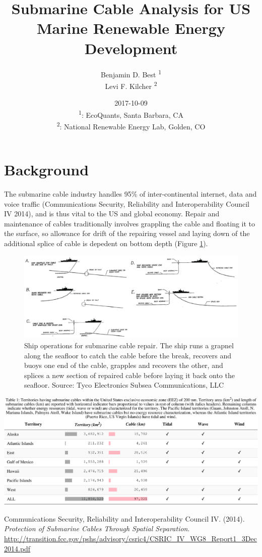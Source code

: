 \documentclass[]{article}
\title{Submarine Cable Analysis for US Marine Renewable Energy Development}
\author{Benjamin D. Best \textsuperscript{1} \\ Levi F. Kilcher \textsuperscript{2}}
\date{2017-10-09\\
\textsuperscript{1}: EcoQuants, Santa Barbara, CA\\
\textsuperscript{2}: National Renewable Energy Lab, Golden, CO \newline}
\begin{document}
\maketitle

{
\setcounter{tocdepth}{4}
\tableofcontents
}
\listoffigures
\section{Background}\label{background}

The submarine cable industry handles 95\% of inter-continental internet,
data and voice traffic (Communications Security, Reliability and
Interoperability Council IV 2014), and is thus vital to the US and
global economy. Repair and maintenance of cables traditionally involves
grappling the cable and floating it to the surface, so allowance for
drift of the repairing vessel and laying down of the additional splice
of cable is depedent on bottom depth (Figure
\ref{fig:figSubmarineCableRepair}).

\begin{figure}
\includegraphics[width=14.17in]{figs/cable-repair-process} \caption{Ship operations for submarine cable repair. The ship runs a grapnel along the seafloor to catch the cable before the break, recovers and buoys one end of the cable, grapples and recovers the other, and splices a new section of repaired cable before laying it back onto the seafloor. Source: Tyco Electronics Subsea Communications, LLC}\label{fig:figSubmarineCableRepair}
\end{figure}

\includegraphics{report_tmp2_files/figure-latex/tbl01Territories-1.pdf}

\hypertarget{refs}{}
\hypertarget{ref-communicationssecurityreliabilityandinteroperabilitycounciliv_protection_2014}{}
Communications Security, Reliability and Interoperability Council IV.
(2014). \emph{Protection of Submarine Cables Through Spatial
Separation}.
\url{http://transition.fcc.gov/pshs/advisory/csric4/CSRIC_IV_WG8_Report1_3Dec2014.pdf}
\end{document}
